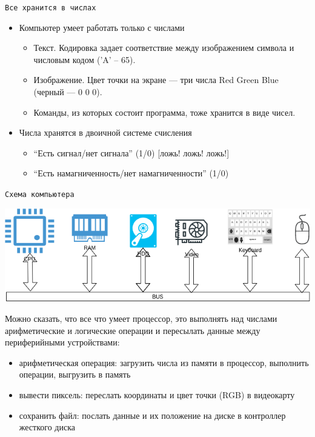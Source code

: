 \documentclass[pdf, 10pt, unicode]{beamer}
\begin{document}
\begin{frame}[fragile]{{\tt Все хранится в числах}}

\begin{itemize}
  \item Компьютер умеет работать только с числами
    \begin{itemize}
        \item Текст. Кодировка задает соответствие между изображением символа и числовым кодом  ('A'  -- 65).
        \item Изображение. Цвет точки на экране --- три числа Red Green Blue  (черный --- 0 0 0).
        \item Команды, из которых состоит программа, тоже хранится в виде чисел.
    \end{itemize}
  \item Числа хранятся в двоичной системе счисления
    \begin{itemize}
        \item ``Есть сигнал/нет сигнала'' (1/0) [ложь! ложь! ложь!]
        \item ``Есть намагниченность/нет намагниченности'' (1/0)
    \end{itemize}
\end{itemize}

\end{frame}

\begin{frame}[fragile]{{\tt Схема компьютера}}

\includegraphics[scale=0.4]{scheme.png}

Можно сказать, что все что умеет процессор, это выполнять над числами арифметические и логические операции и пересылать
данные между периферийными устройствами:
\begin{itemize}
  \item арифметическая операция: загрузить числа из памяти в процессор, выполнить операции, выгрузить в память
  \item вывести пиксель: переслать координаты и цвет точки (RGB) в видеокарту
  \item сохранить файл: послать данные и их положение на диске в контроллер жесткого диска
\end{itemize}
\end{frame}
\end{document}
